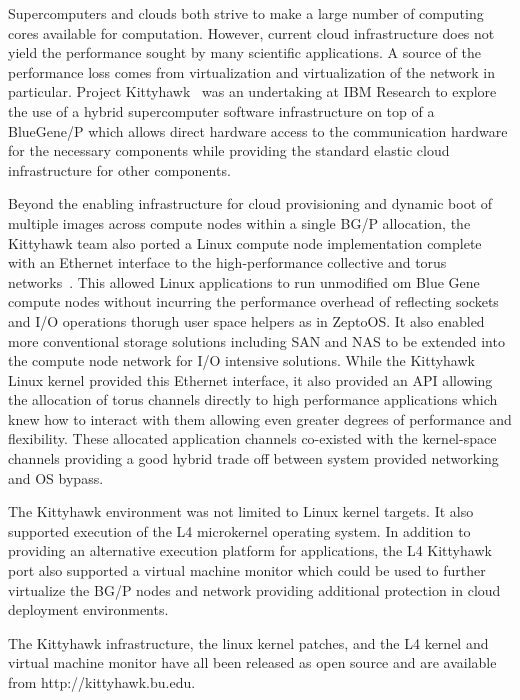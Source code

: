 Supercomputers and clouds both strive to make a large number of 
computing cores available for computation. 
However, current cloud infrastructure does not yield the performance 
sought by many scientific applications. A source of the performance 
loss comes from virtualization and virtualization of the network in 
particular. 
Project Kittyhawk~\cite{kh-sciencecloud} was an undertaking at IBM Research 
to explore the use of a hybrid supercomputer software infrastructure
on top of a BlueGene/P which allows direct hardware access to the 
communication hardware for the necessary components while providing 
the standard elastic cloud infrastructure for other components.

Beyond the enabling infrastructure for cloud provisioning and dynamic
boot of multiple images across compute nodes within a single BG/P
allocation, the Kittyhawk team also ported a Linux compute node
implementation complete with an Ethernet interface to the high-performance
collective and torus networks~\cite{kh-systemsjournal}.  
This allowed Linux applications to run unmodified om Blue Gene compute 
nodes without incurring the performance 
overhead of reflecting sockets and I/O operations thorugh user space
helpers as in ZeptoOS.  It also enabled more conventional storage solutions
including SAN and NAS to be extended into the compute node network for
I/O intensive solutions.  While the Kittyhawk Linux kernel provided this
Ethernet interface, it also provided an API allowing the allocation of
torus channels directly to high performance applications which knew how to
interact with them allowing even greater degrees of performance and flexibility.
These allocated application channels co-existed with the kernel-space channels
providing a good hybrid trade off between system provided networking and
OS bypass.

The Kittyhawk environment was not limited to Linux kernel targets.  
It also supported execution of the L4 microkernel operating system.  
In addition to providing an alternative execution platform for applications,
the L4 Kittyhawk port also supported a virtual machine monitor which could
be used to further virtualize the BG/P nodes and network providing additional
protection in cloud deployment environments.

The Kittyhawk infrastructure, the linux kernel patches, and the L4 kernel
and virtual machine monitor have all been released as open source and are
available from http://kittyhawk.bu.edu.
